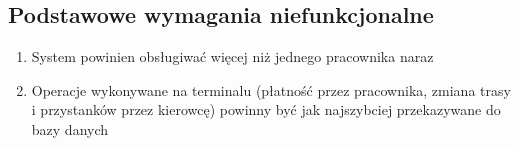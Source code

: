 \subsection{Podstawowe wymagania niefunkcjonalne}
\begin{enumerate}
  \item{System powinien obsługiwać więcej niż jednego pracownika naraz}\label{nfunc_1}
  \item{Operacje wykonywane na terminalu (płatność przez pracownika, zmiana trasy i przystanków przez kierowcę) powinny być jak najszybciej przekazywane do bazy danych}\label{nfunc_2}
\end{enumerate}
